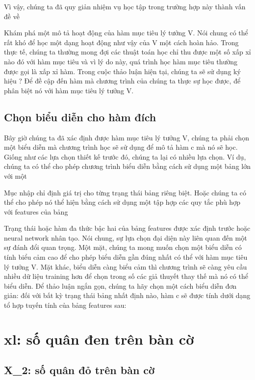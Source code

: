 Vì vậy, chúng ta đã quy giản nhiệm vụ học tập trong trường hợp này thành vấn đề về

Khám phá một mô tả hoạt động của hàm mục tiêu lý tưởng V. Nói chung có thể rất khó để học một dạng hoạt động như vậy của V một cách hoàn hảo. Trong thực tế, chúng ta thường mong đợi các thuật toán học chỉ thu được một số xấp xỉ nào đó với hàm mục tiêu và vì lý do này, quá trình học hàm mục tiêu thường được gọi là xấp xỉ hàm. Trong cuộc thảo luận hiện tại, chúng ta sẽ sử dụng ký hiệu ? Để đề cập đến hàm mà chương trình của chúng ta thực sự học được, để phân biệt nó với hàm mục tiêu lý tưởng V.

\subsection{Chọn biểu diễn cho hàm đích}

Bây giờ chúng ta đã xác định được hàm mục tiêu lý tưởng V, chúng ta phải chọn một biểu diễn mà chương trình học sẽ sử dụng để mô tả hàm c mà nó sẽ học. Giống như các lựa chọn thiết kế trước đó, chúng ta lại có nhiều lựa chọn. Ví dụ, chúng ta có thể cho phép chương trình biểu diễn bằng cách sử dụng một bảng lớn với một

Mục nhập chỉ định giá trị cho từng trạng thái bảng riêng biệt. Hoặc chúng ta có thể cho phép nó thể hiện bằng cách sử dụng một tập hợp các quy tắc phù hợp với features của bảng

Trạng thái hoặc hàm đa thức bậc hai của bảng features được xác định trước hoặc neural network nhân tạo. Nói chung, sự lựa chọn đại diện này liên quan đến một sự đánh đổi quan trọng. Một mặt, chúng ta mong muốn chọn một biểu diễn có tính biểu cảm cao để cho phép biểu diễn gần đúng nhất có thể với hàm mục tiêu lý tưởng V. Mặt khác, biểu diễn càng biểu cảm thì chương trình sẽ càng yêu cầu nhiều dữ liệu training hơn để chọn trong số các giả thuyết thay thế mà nó có thể biểu diễn. Để thảo luận ngắn gọn, chúng ta hãy chọn một cách biểu diễn đơn giản: đối với bất kỳ trạng thái bảng nhất định nào, hàm c sẽ được tính dưới dạng tổ hợp tuyến tính của bảng features sau:

\section{xl: số quân đen trên bàn cờ}

\subsection{X\_2: số quân đỏ trên bàn cờ}

